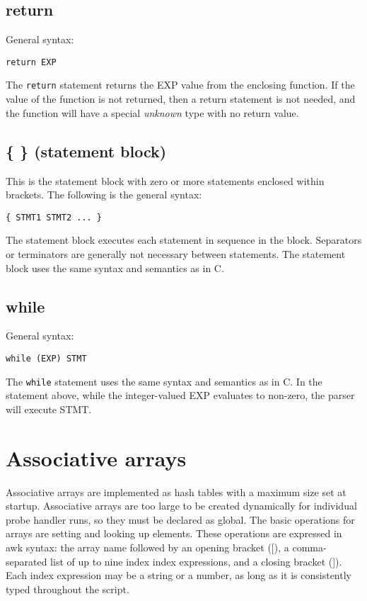 \documentclass[twoside,english]{article}
\newenvironment{vindent}
{\begin{list}{}{\setlength{\listparindent}{6pt}}
\item[]}
{\end{list}}
\begin{document}
\subsection{return}
General syntax:

\begin{vindent}
\begin{verbatim}
return EXP
\end{verbatim}
\end{vindent}
The \texttt{return} statement returns the EXP value from the enclosing function.
If the value of the function is not returned, then a return statement is
not needed, and the function will have a special \emph{unknown} type with
no return value.

\subsection{\{ \} (statement block)}
\index{\{ \}}
This is the statement block with zero or more statements enclosed within
brackets. The following is the general syntax:

\begin{vindent}
\begin{verbatim}
{ STMT1 STMT2 ... }
\end{verbatim}
\end{vindent}
The statement block executes each statement in sequence in the block. Separators
or terminators are generally not necessary between statements. The statement
block uses the same syntax and semantics as in C.


\subsection{while}
General syntax:

\begin{vindent}
\begin{verbatim}
while (EXP) STMT
\end{verbatim}
\end{vindent}
The \texttt{while} statement uses the same syntax and semantics as in C.
In the statement above, while the integer-valued EXP evaluates to non-zero,
the parser will execute STMT.


\section{Associative arrays\label{sec:Associative-Arrays}}
Associative arrays are implemented as hash tables with a maximum size set
at startup. Associative arrays are too large to be created dynamically for
individual probe handler runs, so they must be declared as global. The basic
operations for arrays are setting and looking up elements. These operations
are expressed in awk syntax: the array name followed by an opening bracket
({[}), a comma-separated list of up to nine index index expressions, and
a closing bracket (]). Each index expression may be a string or a number,
as long as it is consistently typed throughout the script.
\end{document}
